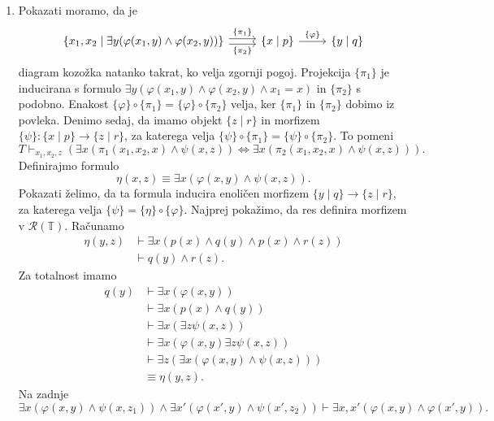 \documentclass[../kategoricna_logika.tex]{subfiles}
\begin{document}
\begin{dokaz}
\begin{enumerate}[label=(\roman*)]
  \item Pokazati moramo, da je
    \begin{equation*}
      \begin{tikzcd}
        \{ x_1,x_2 \mid \exists y(\varphi(x_1,y) \land \varphi(x_2,y)) \}
        \ar[r, shift left, "\{\pi_1\}"] \ar[r, shift right, "\{\pi_2\}"'] &
        \{x \mid p\} \ar[r, "\{\varphi\}"] & \{y \mid q\}
      \end{tikzcd}
    \end{equation*}
    diagram kozožka natanko takrat, ko velja zgornji pogoj.
    Projekcija $\{\pi_1\}$ je inducirana s formulo
    $\exists y(\varphi(x_1,y) \land \varphi(x_2,y) \land x_1 = x )$ in $\{\pi_2\}$ s podobno.
    Enakost $\{\varphi\} \circ \{\pi_1\} = \{ \varphi\} \circ \{\pi_2\}$ velja,
    ker $\{\pi_1\}$ in $\{\pi_2\}$ dobimo iz povleka. Denimo sedaj, da imamo objekt
    $\{ z \mid r\}$ in morfizem $\{\psi\} : \{ x \mid p\} \to \{ z \mid r\}$,
    za katerega velja $\{\psi\} \circ \{\pi_1\} = \{\psi\} \circ \{\pi_2\}$.
    To pomeni
    \[ T \vdash_{x_1,x_2,z} \left(\exists x (\pi_1(x_1,x_2,x) \land \psi(x,z)) \iff
       \exists x (\pi_2(x_1,x_2,x) \land \psi(x,z))\right).
    \]
    Definirajmo formulo
    \[ \eta(x,z) \equiv \exists x(\varphi(x,y) \land \psi(x,z)).\]
    Pokazati želimo, da ta formula inducira enoličen morfizem $\{y \mid q\} \to \{z \mid r\}$,
    za katerega velja $\{\psi\} = \{ \eta\} \circ \{\varphi\}$.
    Najprej pokažimo, da res definira morfizem v $\mathcal{R}(\mathbb{T})$.
    Računamo
    \begin{align*}
      \eta(y,z) &\vdash \exists x(p(x) \land q(y) \land p(x) \land r(z)) \\
                &\vdash q(y) \land r(z).
    \end{align*}
    Za totalnost imamo    
    \begin{align*}
      q(y) &\vdash\exists x(\varphi(x,y)) \\
           &\vdash \exists x(p(x) \land q(y)) \\
           &\vdash \exists x (\exists z \psi(x,z)) \\
           &\vdash \exists x(\varphi(x,y) \exists z \psi(x,z)) \\
           &\vdash \exists z ( \exists x(\varphi(x,y) \land \psi(x,z))) \\
      &\equiv \eta(y,z).
    \end{align*}
    Na zadnje
    \[ \exists x(\varphi(x,y) \land \psi(x,z_1)) \land \exists x' (\varphi(x',y) \land \psi(x',z_2))
      \vdash \exists x,x'(\varphi(x,y) \land \varphi(x',y)).\]

\end{enumerate}
\end{dokaz}
\end{document}
